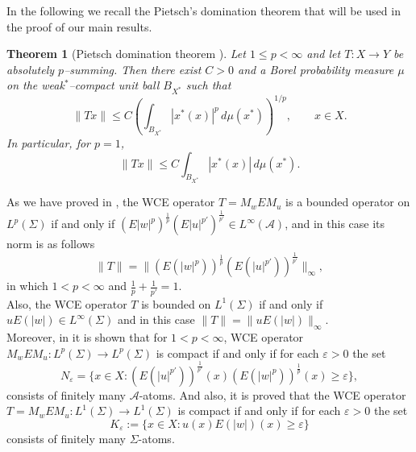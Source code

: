 \documentclass{amsart}
\newtheorem{thm}{Theorem}[section]
\theoremstyle{definition}\newtheorem{defn}[thm]{Definition}
\theoremstyle{remark}
\numberwithin{equation}{section}
\begin{document}
In the following we recall the Pietsch's domination theorem that will be used in the proof of our main results.

\begin{thm}[Pietsch domination theorem {\cite[Theorem~2.12]{die}}]\label{thm:Pietsch}
Let $1\le p<\infty$ and let $T:X\to Y$ be absolutely $p$--summing.
Then there exist $C>0$ and a Borel probability measure $\mu$ on the weak$^{*}$--compact unit ball $B_{X^*}$ such that
\[
\|Tx\|
\le C\left(\int_{B_{X^*}} |x^*(x)|^p\,d\mu(x^*)\right)^{1/p},
\qquad x\in X.
\]
In particular, for $p=1$,
\[
\|Tx\|\le C\int_{B_{X^*}} |x^*(x)|\,d\mu(x^*).
\]
\end{thm}

As we have proved in \cite{ej}, the WCE operator $T=M_wEM_u$ is a bounded operator on $L^{p}(\Sigma)$ if and only if
$(E|w|^{p})^{\frac{1}{p}}(E|u|^{p'})^{\frac{1}{p'}} \in
L^{\infty}(\mathcal{A})$,
 and in this case its norm is as follows
$$\|T\|=\|(E(|w|^{p}))^{\frac{1}{p}}(E(|u|^{p'}))^{\frac{1}{p'}}\|_{\infty},$$
in which $1<p<\infty$ and $\frac{1}{p}+\frac{1}{p'}=1$.\\
Also, the WCE operator $T$ is bounded on $L^{1}(\Sigma)$ if and only if
$uE(|w|) \in L^{\infty}(\Sigma)$ and in this case
$\|T\|=\|uE(|w|)\|_{\infty}$.\\

Moreover, in \cite{ej} it is shown that for $1<p<\infty$, WCE operator $M_wEM_u:L^{p}(\Sigma)\rightarrow
L^{p}(\Sigma)$ is compact if and only if for each $\varepsilon>0$
the set
 $$N_{\varepsilon}=\{x\in
X:(E(|u|^{p'}))^{\frac{1}{p'}}(x)(E(|w|^{p}))^{\frac{1}{p}}(x)\geq\varepsilon\},$$
consists of finitely many $\mathcal{A}$-atoms. And also, it is proved that the WCE operator $T=M_wEM_u:L^{1}(\Sigma)\rightarrow L^{1}(\Sigma)$ is
compact if and only if for each $\varepsilon>0$ the set
 $$K_\varepsilon:=\{x\in X:u(x)E(|w|)(x)\geq\varepsilon\}$$
 consists of finitely many
$\Sigma$-atoms.
\end{document}

